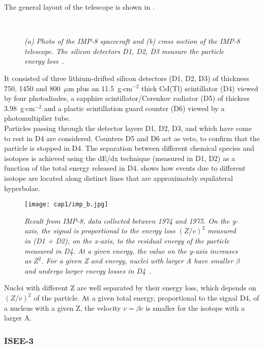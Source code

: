 The general layout of the telescope is shown in .
\begin{figure}
  \centering
   \\
  \caption{\textit{(a) Photo of the IMP-8 spacecraft and (b) cross
      section of the IMP-8 telescope. The silicon detectors D1, D2, D3
      measure the particle energy
      loss~\cite{Spurio}.}}\label{imp_satellite}
\end{figure}
It consisted of three lithium-drifted silicon detectors (D1, D2, D3)
of thickness 750, 1450 and 800~$\mu$m plus an 11.5~g$\cdot$cm$^{-2}$
thick CsI(Tl) scintillator (D4) viewed by four photodiodes, a sapphire
scintillator/Cerenkov radiator (D5) of thickess 3.98~g$\cdot$cm$^{-2}$
and a plastic scintillation guard counter (D6) viewed by a
photomultiplier
tube.\\
Particles passing through the detector layers D1, D2, D3, and which
have come to rest in D4 are considered. Counters D5 and D6 act as
veto, to confirm that the particle is stopped in D4. The separation
between different chemical species and isotopes is achieved using the
dE/dx technique (measured in D1, D2) as a function of the total energy
released in D4.  shows how events due to different isotope
are located along distinct lines that are approximately equilateral
hyperbolae.
\begin{figure}[!htbp]
  \centering
  \texttt{[image: cap1/imp\_b.jpg]}
  \caption{\textit{Result from IMP-8, data collected between 1974 and
      1975. On the y-axis, the signal is proportional to the energy
      loss $ (Z/v)^2$ measured in (D1 + D2), on the x-axis, to the
      residual energy of the particle measured in D4. At a given
      energy, the value on the y-axis increases as $Z^2$. For a given Z
      and energy, nuclei with larger A have smaller $\beta$ and undergo
      larger energy losses in D4~\cite{Spurio}.}}\label{imp_b}
\end{figure}
Nuclei with different Z are well separated by their energy loss, which
depends on $(Z/v)^2$ of the particle. At a given total energy,
proportional to the signal D4, of a nucleus with a given Z, the
velocity $v = \beta c$ is smaller for the isotope with a larger A.\\

\subsubsection*{ISEE-3}

